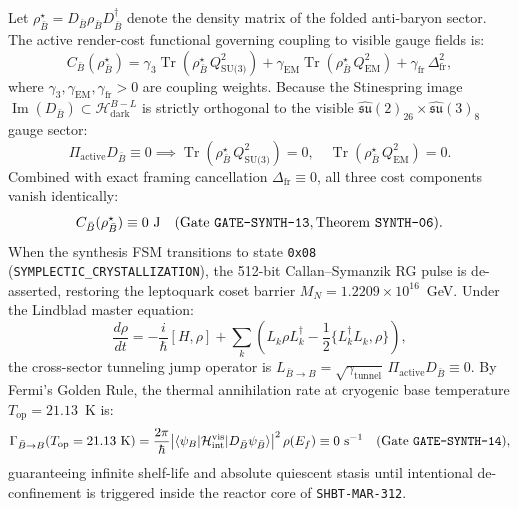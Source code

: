 \documentclass[11pt,onecolumn]{article}
\DeclareMathOperator{\Tr}{Tr}
\begin{document}
Let $\rho^\star_{\bar{B}} = D_{\bar{B}} \rho_{\bar{B}} D_{\bar{B}}^\dagger$ denote the density matrix of the folded anti-baryon sector. The active render-cost functional governing coupling to visible gauge fields is:
\begin{equation}
C_{\bar{B}}(\rho^\star_{\bar{B}}) = \gamma_3 \Tr\left(\rho^\star_{\bar{B}}\,Q_{\text{SU(3)}}^2\right) + \gamma_{\text{EM}} \Tr\left(\rho^\star_{\bar{B}}\,Q_{\text{EM}}^2\right) + \gamma_{\text{fr}}\,\Delta_{\text{fr}}^2,
\label{eq:render_cost}
\end{equation}
where $\gamma_3, \gamma_{\text{EM}}, \gamma_{\text{fr}} > 0$ are coupling weights. Because the Stinespring image $\operatorname{Im}(D_{\bar{B}}) \subset \mathcal{H}_{\text{dark}}^{B-L}$ is strictly orthogonal to the visible $\widehat{\mathfrak{su}}(2)_{26} \times \widehat{\mathfrak{su}}(3)_8$ gauge sector:
\begin{equation}
\Pi_{\text{active}} D_{\bar{B}} \equiv 0 \implies \Tr\left(\rho^\star_{\bar{B}}\,Q_{\text{SU(3)}}^2\right) = 0, \quad \Tr\left(\rho^\star_{\bar{B}}\,Q_{\text{EM}}^2\right) = 0.
\label{eq:gauge_orthogonality}
\end{equation}
Combined with exact framing cancellation $\Delta_{\text{fr}} \equiv 0$, all three cost components vanish identically:
\begin{equation}
C_{\bar{B}}(\rho^\star_{\bar{B}}) \equiv 0~\text{J} \quad (\text{Gate \texttt{GATE-SYNTH-13}}, \text{Theorem \texttt{SYNTH-06}}).
\label{eq:cost_zero}
\end{equation}
When the synthesis FSM transitions to state \texttt{0x08} (\texttt{SYMPLECTIC\_CRYSTALLIZATION}), the 512-bit Callan--Symanzik RG pulse is de-asserted, restoring the leptoquark coset barrier $M_N = 1.2209\times 10^{16}$~GeV. Under the Lindblad master equation:
\begin{equation}
\frac{d\rho}{dt} = -\frac{i}{\hbar}[H, \rho] + \sum_k \left(L_k \rho L_k^\dagger - \frac{1}{2}\{L_k^\dagger L_k, \rho\}\right),
\label{eq:lindblad}
\end{equation}
the cross-sector tunneling jump operator is $L_{\bar{B}\to B} = \sqrt{\gamma_{\text{tunnel}}}\,\Pi_{\text{active}} D_{\bar{B}} \equiv 0$. By Fermi's Golden Rule, the thermal annihilation rate at cryogenic base temperature $T_{\text{op}} = 21.13$~K is:
\begin{equation}
\Gamma_{\bar{B}\to B}(T_{\text{op}} = 21.13~\text{K}) = \frac{2\pi}{\hbar}\bigl|\langle \psi_B | \mathcal{H}_{\text{int}}^{\text{vis}} | D_{\bar{B}}\psi_{\bar{B}}\rangle\bigr|^2\,\rho(E_f) \equiv 0~\text{s}^{-1} \quad (\text{Gate \texttt{GATE-SYNTH-14}}),
\label{eq:annihilation_zero}
\end{equation}
guaranteeing infinite shelf-life and absolute quiescent stasis until intentional de-confinement is triggered inside the reactor core of \texttt{SHBT-MAR-312}.
\end{document}
